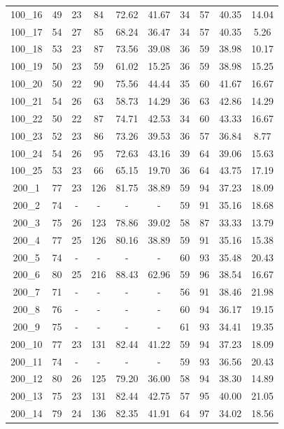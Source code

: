\documentclass[a4paper,final]{article}
\begin{document}
\begin{longtable}[c]{cccccccccc}
100\_16 & 49  & 23 & 84  & 72.62 & 41.67 & 34  & 57  & 40.35 & 14.04 \\
100\_17 & 54  & 27 & 85  & 68.24 & 36.47 & 34  & 57  & 40.35 & 5.26  \\
100\_18 & 53  & 23 & 87  & 73.56 & 39.08 & 36  & 59  & 38.98 & 10.17 \\
100\_19 & 50  & 23 & 59  & 61.02 & 15.25 & 36  & 59  & 38.98 & 15.25 \\
100\_20 & 50  & 22 & 90  & 75.56 & 44.44 & 35  & 60  & 41.67 & 16.67 \\
100\_21 & 54  & 26 & 63  & 58.73 & 14.29 & 36  & 63  & 42.86 & 14.29 \\
100\_22 & 50  & 22 & 87  & 74.71 & 42.53 & 34  & 60  & 43.33 & 16.67 \\
100\_23 & 52  & 23 & 86  & 73.26 & 39.53 & 36  & 57  & 36.84 & 8.77  \\
100\_24 & 54  & 26 & 95  & 72.63 & 43.16 & 39  & 64  & 39.06 & 15.63 \\
100\_25 & 53  & 23 & 66  & 65.15 & 19.70 & 36  & 64  & 43.75 & 17.19 \\
200\_1  & 77  & 23 & 126 & 81.75 & 38.89 & 59  & 94  & 37.23 & 18.09 \\
200\_2  & 74  & -  & -   & -     & -     & 59  & 91  & 35.16 & 18.68 \\
200\_3  & 75  & 26 & 123 & 78.86 & 39.02 & 58  & 87  & 33.33 & 13.79 \\
200\_4  & 77  & 25 & 126 & 80.16 & 38.89 & 59  & 91  & 35.16 & 15.38 \\
200\_5  & 74  & -  & -   & -     & -     & 60  & 93  & 35.48 & 20.43 \\
200\_6  & 80  & 25 & 216 & 88.43 & 62.96 & 59  & 96  & 38.54 & 16.67 \\
200\_7  & 71  & -  & -   & -     & -     & 56  & 91  & 38.46 & 21.98 \\
200\_8  & 76  & -  & -   & -     & -     & 60  & 94  & 36.17 & 19.15 \\
200\_9  & 75  & -  & -   & -     & -     & 61  & 93  & 34.41 & 19.35 \\
200\_10 & 77  & 23 & 131 & 82.44 & 41.22 & 59  & 94  & 37.23 & 18.09 \\
200\_11 & 74  & -  & -   & -     & -     & 59  & 93  & 36.56 & 20.43 \\
200\_12 & 80  & 26 & 125 & 79.20 & 36.00 & 58  & 94  & 38.30 & 14.89 \\
200\_13 & 75  & 23 & 131 & 82.44 & 42.75 & 57  & 95  & 40.00 & 21.05 \\
200\_14 & 79  & 24 & 136 & 82.35 & 41.91 & 64  & 97  & 34.02 & 18.56 \\

\end{longtable}
\end{document}
